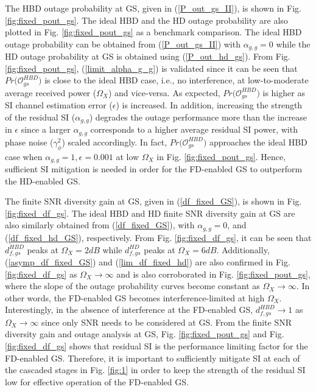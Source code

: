 The HBD outage probability at GS, given in (\ref{P_out_gs_II}), is shown in Fig. \ref{fig:fixed_pout_gs}. The ideal HBD and the HD outage probability are also plotted in Fig. \ref{fig:fixed_pout_gs} as a benchmark comparison. The ideal HBD outage probability can be obtained from (\ref{P_out_gs_II}) with $\alpha_{g,g}=0$ while the HD outage probability at GS is obtained using (\ref{P_out_hd_gs}). From Fig. \ref{fig:fixed_pout_gs}, (\ref{limit_alpha_g_g}) is validated since it can be seen that $Pr\big(\mathcal{O}_{gs}^{HBD}\big)$ is close to the ideal HBD case, i.e., no interference, at low-to-moderate average received power ($\Omega_X$) and vice-versa. As expected, $Pr\big(\mathcal{O}_{gs}^{HBD}\big)$ is higher as SI channel estimation error ($\epsilon$) is increased. In addition, increasing the strength of the residual SI ($\alpha_{g,g}$) degrades the outage performance more than the increase in $\epsilon$ since a larger $\alpha_{g,g}$ corresponds to a higher average residual SI power, with phase noise ($\gamma^2_{\phi}$) scaled accordingly. In fact, $Pr\big(\mathcal{O}_{gs}^{HBD}\big)$ approaches the ideal HBD case when $\alpha_{g,g}=1, \epsilon=0.001$ at low $\Omega_X$ in Fig. \ref{fig:fixed_pout_gs}. Hence, sufficient SI mitigation is needed in order for the FD-enabled GS to outperform the HD-enabled GS. 

The finite SNR diversity gain at GS, given in (\ref{df_fixed_GS}), is shown in Fig. \ref{fig:fixed_df_gs}. The ideal HBD and HD finite SNR diversity gain at GS are also similarly obtained from (\ref{df_fixed_GS}), with $\alpha_{g,g}=0$, and (\ref{df_fixed_hd_GS}), respectively. From Fig. \ref{fig:fixed_df_gs}, it can be seen that $d_{f,gs}^{HBD}$ peaks at $\Omega_X=2dB$ while $d_{f,gs}^{HD}$ peaks at $\Omega_X=6dB$. Additionally, (\ref{asymp_df_fixed_GS}) and (\ref{lim_df_fixed_hd}) are also confirmed in Fig. \ref{fig:fixed_df_gs} as $\Omega_X \to \infty$ and is also corroborated in Fig. \ref{fig:fixed_pout_gs}, where the slope of the outage probability curves become constant as $\Omega_X \to \infty$. In other words, the FD-enabled GS becomes interference-limited at high $\Omega_X$. Interestingly, in the absence of interference at the FD-enabled GS, $d_{f,gs}^{HBD} \to 1$ as $\Omega_X \to \infty$ since only SNR needs to be considered at GS. From the finite SNR diversity gain and outage analysis at GS, Fig. \ref{fig:fixed_pout_gs} and Fig. \ref{fig:fixed_df_gs} shows that residual SI is the performance limiting factor for the FD-enabled GS. Therefore, it is important to sufficiently mitigate SI at each of the cascaded stages in Fig. \ref{fig:1} in order to keep the strength of the residual SI low for effective operation of the FD-enabled GS.

